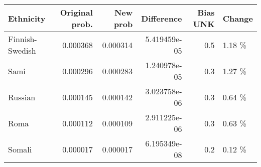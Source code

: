 \begin{tabular}{lrrrrl}
\toprule
      Ethnicity &  Original prob. &  New prob &   Difference &  Bias UNK & Change \\
\midrule
Finnish-Swedish &        0.000368 &  0.000314 & 5.419459e-05 &       0.5 & 1.18 \% \\
           Sami &        0.000296 &  0.000283 & 1.240978e-05 &       0.3 & 1.27 \% \\
        Russian &        0.000145 &  0.000142 & 3.023758e-06 &       0.3 & 0.64 \% \\
           Roma &        0.000112 &  0.000109 & 2.911225e-06 &       0.3 & 0.63 \% \\
         Somali &        0.000017 &  0.000017 & 6.195349e-08 &       0.2 & 0.12 \% \\
\bottomrule
\end{tabular}
